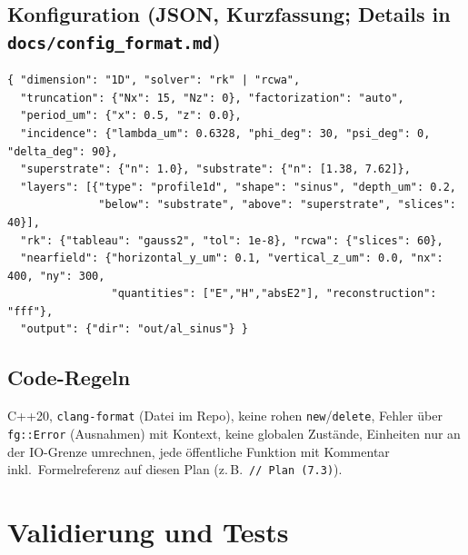 \subsection{Konfiguration (JSON, Kurzfassung; Details in \texttt{docs/config\_format.md})}
{\footnotesize\begin{verbatim}
{ "dimension": "1D", "solver": "rk" | "rcwa",
  "truncation": {"Nx": 15, "Nz": 0}, "factorization": "auto",
  "period_um": {"x": 0.5, "z": 0.0},
  "incidence": {"lambda_um": 0.6328, "phi_deg": 30, "psi_deg": 0, "delta_deg": 90},
  "superstrate": {"n": 1.0}, "substrate": {"n": [1.38, 7.62]},
  "layers": [{"type": "profile1d", "shape": "sinus", "depth_um": 0.2,
              "below": "substrate", "above": "superstrate", "slices": 40}],
  "rk": {"tableau": "gauss2", "tol": 1e-8}, "rcwa": {"slices": 60},
  "nearfield": {"horizontal_y_um": 0.1, "vertical_z_um": 0.0, "nx": 400, "ny": 300,
                "quantities": ["E","H","absE2"], "reconstruction": "fff"},
  "output": {"dir": "out/al_sinus"} }
\end{verbatim}}

\subsection{Code-Regeln}
C++20, \verb|clang-format| (Datei im Repo), keine rohen \verb|new|/\verb|delete|, Fehler über
\verb|fg::Error| (Ausnahmen) mit Kontext, keine globalen Zustände, Einheiten nur an der IO-Grenze
umrechnen, jede öffentliche Funktion mit Kommentar inkl.\ Formelreferenz auf diesen Plan
(z.\,B.\ \verb|// Plan (7.3)|).

\section{Validierung und Tests}\label{sec:validation}

